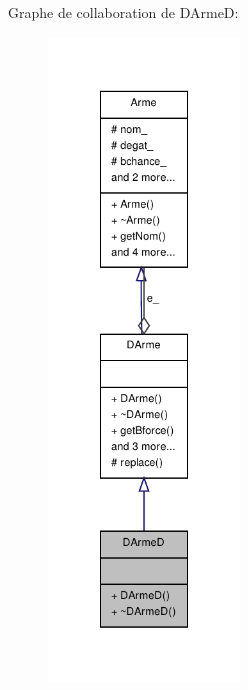 Graphe de collaboration de D\-Arme\-D\-:
\nopagebreak
\begin{figure}[H]
\begin{center}
\leavevmode
\includegraphics[width=144pt]{class_d_arme_d__coll__graph}
\end{center}
\end{figure}
